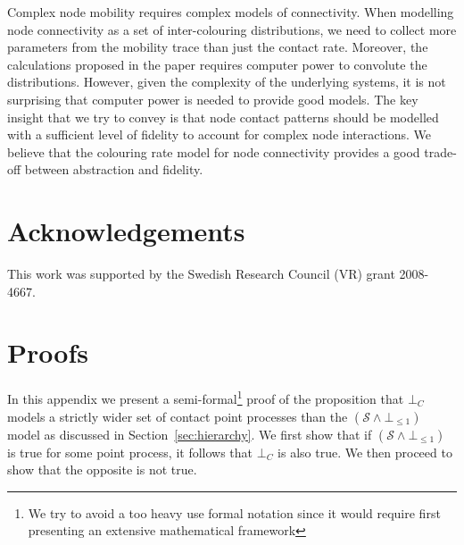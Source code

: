 \documentclass{article}
\begin{document}
Complex node mobility requires complex models of connectivity. When
modelling node connectivity as a set of inter-colouring distributions,
we need to collect more parameters from the mobility trace than just
the contact rate. Moreover, the calculations proposed in the paper
requires computer power to convolute the distributions. However, given
the complexity of the underlying systems, it is not surprising that
computer power is needed to provide good models. The key insight that
we try to convey is that node contact patterns should be modelled with
a sufficient level of fidelity to account for complex node
interactions. We believe that the colouring rate model for node
connectivity provides a good trade-off between abstraction and
fidelity.



\section{Acknowledgements}
This work was supported by the Swedish Research Council (VR) grant
2008-4667. 


\appendix


\section{Proofs}


In this appendix we present a semi-formal\footnote{We try to avoid a
  too heavy use formal notation since it would require first
  presenting an extensive mathematical framework} proof of the
proposition that $\bot_C$ models a strictly wider set of contact point
processes than the $(\mathcal{S} \land \bot_{\le 1})$ model as
discussed in Section~\ref{sec:hierarchy}. We first show that if
$(\mathcal{S} \land \bot_{\le 1})$ is true for some point process, it
follows that $\bot_C$ is also true. We then proceed to show that the
opposite is not true.
\end{document}
